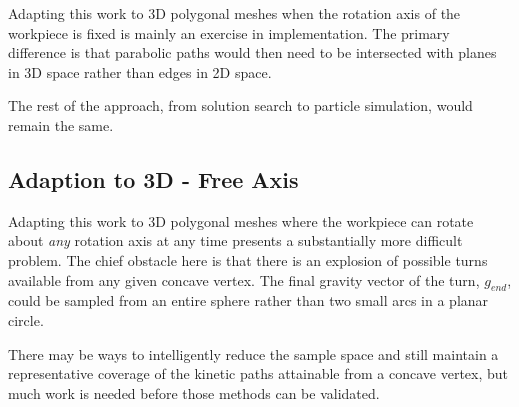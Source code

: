 Adapting this work to 3D polygonal meshes when the rotation axis of the workpiece is fixed is mainly an exercise in implementation. The primary difference is that parabolic paths would then need to be intersected with planes in 3D space rather than edges in 2D space.

The rest of the approach, from solution search to particle simulation, would remain the same.

  \subsection{Adaption to 3D - Free Axis}

Adapting this work to 3D polygonal meshes where the workpiece can rotate about \emph{any} rotation axis at any time presents a substantially more difficult problem. The chief obstacle here is that there is an explosion of possible turns available from any given concave vertex. The final gravity vector of the turn, $g_{end}$, could be sampled from an entire sphere rather than two small arcs in a planar circle.

There may be ways to intelligently reduce the sample space and still maintain a representative coverage of the kinetic paths attainable from a concave vertex, but much work is needed before those methods can be validated.

